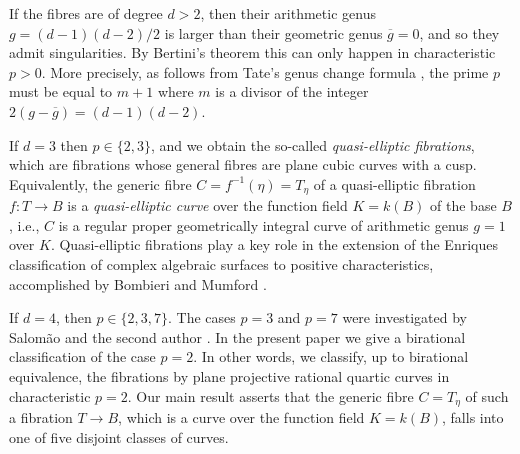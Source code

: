 \documentclass[12pt,reqno]{amsart}
\theoremstyle{definition}
\newcommand{\ov}{\overline}
\begin{document}
If the fibres are of degree $d>2$, then their arithmetic genus $g = (d-1)(d-2)/2$ is larger than their geometric genus $\ov g = 0$, and so they admit singularities.
By Bertini's theorem this can only happen in characteristic $p>0$.
More precisely, 
as follows from Tate's genus change formula \cite{Tate52},
the prime $p$ must be equal to $m+1$ where $m$ is a divisor of the integer $2 (g - \ov g) = (d-1)(d-2)$.

If $d=3$ then $p\in\{2,3\}$, and we obtain the so-called \emph{quasi-elliptic fibrations}, which are fibrations whose general fibres are plane cubic curves with a cusp.
Equivalently, the generic fibre $C=f^{-1}(\eta) = T_\eta$ of a quasi-elliptic fibration $f:T\to B$ is a \emph{quasi-elliptic curve} over the function field $K=k(B)$ of the base $B$, i.e., $C$ is a regular proper geometrically integral curve of arithmetic genus $g=1$ over $K$.
Quasi-elliptic fibrations play a key role in the extension of the Enriques classification of complex algebraic surfaces to positive characteristics, accomplished by Bombieri and Mumford \cite{BM76,BM77}.

If $d=4$, then $p\in\{2,3,7\}$.
The cases $p=3$ and $p=7$ were investigated by Salomão \cite{Sal11,Sal14} and the second author \cite{St04}.
In the present paper we give a birational classification of the case $p=2$.
In other words, we classify, up to birational equivalence, the fibrations by plane projective rational quartic curves in characteristic $p=2$.
Our main result asserts that the generic fibre $C=T_\eta$ of such a fibration $T \to B$, which is a curve over the function field $K=k(B)$, falls into one of five disjoint classes of curves.



\end{document}
